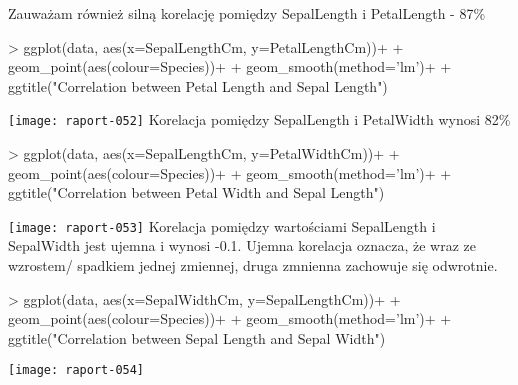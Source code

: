 \documentclass{article}
\begin{document}
Zauważam również silną korelację pomiędzy SepalLength i PetalLength - 87\%
\begin{Schunk}
\begin{Sinput}
> ggplot(data, aes(x=SepalLengthCm, y=PetalLengthCm))+
+   geom_point(aes(colour=Species))+
+   geom_smooth(method='lm')+
+   ggtitle("Correlation between Petal Length and Sepal Length")
\end{Sinput}
\end{Schunk}
\texttt{[image: raport-052]}
\newpage
Korelacja pomiędzy SepalLength i PetalWidth wynosi 82\%
\begin{Schunk}
\begin{Sinput}
> ggplot(data, aes(x=SepalLengthCm, y=PetalWidthCm))+
+   geom_point(aes(colour=Species))+
+   geom_smooth(method='lm')+
+   ggtitle("Correlation between Petal Width and Sepal Length")
\end{Sinput}
\end{Schunk}
\texttt{[image: raport-053]}
\newpage
Korelacja pomiędzy wartościami SepalLength i SepalWidth jest ujemna i wynosi -0.1. Ujemna korelacja oznacza, że wraz ze wzrostem/ spadkiem jednej zmiennej, druga zmnienna zachowuje się odwrotnie.
\begin{Schunk}
\begin{Sinput}
> ggplot(data, aes(x=SepalWidthCm, y=SepalLengthCm))+
+   geom_point(aes(colour=Species))+
+   geom_smooth(method='lm')+
+   ggtitle("Correlation between Sepal Length and Sepal Width")
\end{Sinput}
\end{Schunk}
\texttt{[image: raport-054]}
\end{document}

